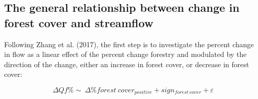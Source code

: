 \documentclass[]{elsarticle} %
\begin{document}
\hypertarget{the-general-relationship-between-change-in-forest-cover-and-streamflow}{%
\subsection{The general relationship between change in forest cover and streamflow}\label{the-general-relationship-between-change-in-forest-cover-and-streamflow}}

Following Zhang et al. (2017), the first step is to investigate the percent change in flow as a linear effect of the percent change forestry and modulated by the direction of the change, either an increase in forest cover, or decrease in forest cover:

\begin{equation}
\Delta Qf \% \sim ~ \Delta \% forest~cover_{positive} + sign_{forest~cover} + \varepsilon \label{eq:eq3}
\end{equation}
\end{document}
